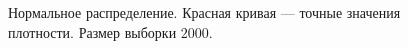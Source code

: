 \documentclass[12pt, a4paper]{article}
\begin{document}
\begin{figure}[H]
\caption{Нормальное распределение. Красная кривая --- точные значения плотности. Размер выборки $2000$.}
\end{figure}
\end{document}
